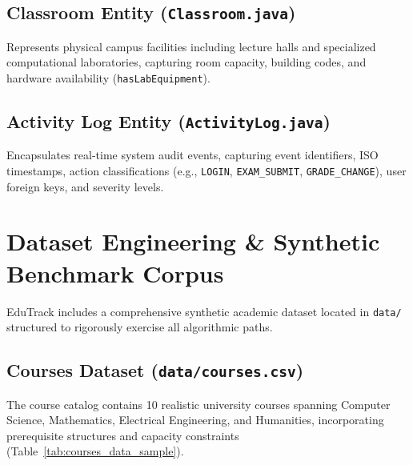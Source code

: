 \subsection{Classroom Entity (\texttt{Classroom.java})}
Represents physical campus facilities including lecture halls and specialized computational laboratories, capturing room capacity, building codes, and hardware availability (\texttt{hasLabEquipment}).

\subsection{Activity Log Entity (\texttt{ActivityLog.java})}
Encapsulates real-time system audit events, capturing event identifiers, ISO timestamps, action classifications (e.g., \texttt{LOGIN}, \texttt{EXAM\_SUBMIT}, \texttt{GRADE\_CHANGE}), user foreign keys, and severity levels.

\section{Dataset Engineering \& Synthetic Benchmark Corpus}
EduTrack includes a comprehensive synthetic academic dataset located in \texttt{data/} structured to rigorously exercise all algorithmic paths.

\subsection{Courses Dataset (\texttt{data/courses.csv})}
The course catalog contains 10 realistic university courses spanning Computer Science, Mathematics, Electrical Engineering, and Humanities, incorporating prerequisite structures and capacity constraints (Table~\ref{tab:courses_data_sample}).

